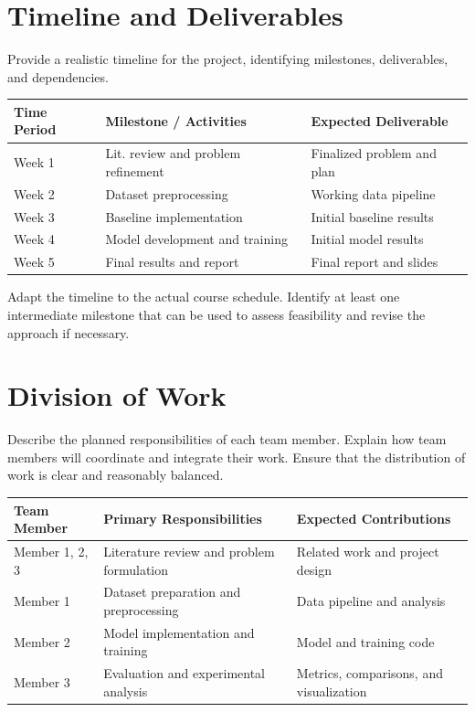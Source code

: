 \documentclass[11pt]{article}
\begin{document}
\section{Timeline and Deliverables}

Provide a realistic timeline for the project, identifying milestones,
deliverables, and dependencies.

\begin{center}
\begin{tabularx}{\textwidth}{p{} X X}
    \toprule
    \textbf{Time Period} &
    \textbf{Milestone / Activities} &
    \textbf{Expected Deliverable} \\
    \midrule
    Week 1 & Lit. review and problem refinement & Finalized problem and plan \\
    Week 2 & Dataset preprocessing & Working data pipeline \\
    Week 3 & Baseline implementation & Initial baseline results \\
    Week 4 & Model development and training & Initial model results \\
    Week 5 & Final results and report & Final report and slides \\
    \bottomrule
\end{tabularx}
\end{center}

Adapt the timeline to the actual course schedule. Identify at least
one intermediate milestone that can be used to assess feasibility
and revise the approach if necessary.

\section{Division of Work}

Describe the planned responsibilities of each team member. Explain how team members will coordinate and integrate their work.
Ensure that the distribution of work is clear and reasonably balanced.

\begin{center}
\begin{tabularx}{\textwidth}{l X X}
    \toprule
    \textbf{Team Member} &
    \textbf{Primary Responsibilities} &
    \textbf{Expected Contributions} \\
    \midrule
    Member 1, 2, 3 & Literature review and problem formulation & Related work and project design \\
    Member 1 & Dataset preparation and preprocessing & Data pipeline and analysis \\
    Member 2 & Model implementation and training & Model and training code \\
    Member 3 & Evaluation and experimental analysis & Metrics, comparisons, and visualization \\
    \bottomrule
\end{tabularx}
\end{center}







\end{document}
